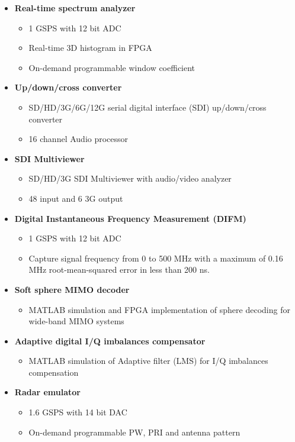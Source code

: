 
\begin{itemize}
	\item \textbf{Real-time spectrum analyzer}
	      \begin{itemize}
		      \item 1 GSPS with 12 bit ADC
		      \item Real-time 3D histogram in FPGA
		      \item On-demand programmable window coefficient
	      \end{itemize}
	\item \textbf{Up/down/cross converter}
	      \begin{itemize}
		      \item SD/HD/3G/6G/12G serial digital interface (SDI) up/down/cross converter
		      \item 16 channel Audio processor
	      \end{itemize}
	\item \textbf{SDI Multiviewer}
	      \begin{itemize}
		      \item SD/HD/3G SDI Multiviewer with audio/video analyzer 
		      \item 48 input and 6 3G output
	      \end{itemize}
	\item \textbf{Digital Instantaneous Frequency Measurement (DIFM)}
	      \begin{itemize}
		      \item 1 GSPS with 12 bit ADC
		      \item Capture signal frequency from 0 to 500 MHz with a maximum of 0.16 MHz root-mean-squared error in less than 200 ns.
	      \end{itemize}
	\item \textbf{Soft sphere MIMO decoder}
	      \begin{itemize}
		      \item MATLAB simulation and FPGA implementation of sphere decoding for wide-band MIMO systems
	      \end{itemize}
	\item \textbf{Adaptive digital I/Q imbalances compensator}
	      \begin{itemize}
		      \item MATLAB simulation of Adaptive filter (LMS) for I/Q imbalances compensation
	      \end{itemize}
	\item \textbf{Radar emulator}
	      \begin{itemize}
		      \item 1.6 GSPS with 14 bit DAC
		      \item On-demand programmable PW, PRI and antenna pattern
	      \end{itemize}
\end{itemize}